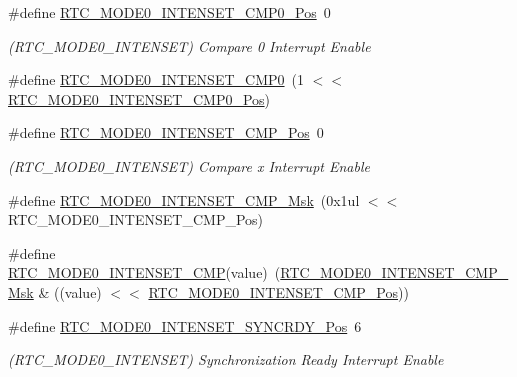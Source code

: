 \begin{DoxyCompactItemize}
\#define \mbox{\hyperlink{group___s_a_m_d21___r_t_c_ga00b70aff1636314843a9f4d3e8d1c27f}{R\+T\+C\+\_\+\+M\+O\+D\+E0\+\_\+\+I\+N\+T\+E\+N\+S\+E\+T\+\_\+\+C\+M\+P0\+\_\+\+Pos}}~0
\begin{DoxyCompactList}\small\item\em (R\+T\+C\+\_\+\+M\+O\+D\+E0\+\_\+\+I\+N\+T\+E\+N\+S\+ET) Compare 0 Interrupt Enable \end{DoxyCompactList}\item 
\#define \mbox{\hyperlink{group___s_a_m_d21___r_t_c_ga0067531668edb6910c70cd57eea04765}{R\+T\+C\+\_\+\+M\+O\+D\+E0\+\_\+\+I\+N\+T\+E\+N\+S\+E\+T\+\_\+\+C\+M\+P0}}~(1 $<$$<$ \mbox{\hyperlink{group___s_a_m_d21___r_t_c_ga00b70aff1636314843a9f4d3e8d1c27f}{R\+T\+C\+\_\+\+M\+O\+D\+E0\+\_\+\+I\+N\+T\+E\+N\+S\+E\+T\+\_\+\+C\+M\+P0\+\_\+\+Pos}})
\item 
\#define \mbox{\hyperlink{group___s_a_m_d21___r_t_c_gaac99a4ba6781229ea22960ac65244ace}{R\+T\+C\+\_\+\+M\+O\+D\+E0\+\_\+\+I\+N\+T\+E\+N\+S\+E\+T\+\_\+\+C\+M\+P\+\_\+\+Pos}}~0
\begin{DoxyCompactList}\small\item\em (R\+T\+C\+\_\+\+M\+O\+D\+E0\+\_\+\+I\+N\+T\+E\+N\+S\+ET) Compare x Interrupt Enable \end{DoxyCompactList}\item 
\#define \mbox{\hyperlink{group___s_a_m_d21___r_t_c_gadb7a972905c2e549aaff1355358b66ae}{R\+T\+C\+\_\+\+M\+O\+D\+E0\+\_\+\+I\+N\+T\+E\+N\+S\+E\+T\+\_\+\+C\+M\+P\+\_\+\+Msk}}~(0x1ul $<$$<$ R\+T\+C\+\_\+\+M\+O\+D\+E0\+\_\+\+I\+N\+T\+E\+N\+S\+E\+T\+\_\+\+C\+M\+P\+\_\+\+Pos)
\item 
\#define \mbox{\hyperlink{group___s_a_m_d21___r_t_c_gabf27c28f941fc2a7a091ed7ee0418fda}{R\+T\+C\+\_\+\+M\+O\+D\+E0\+\_\+\+I\+N\+T\+E\+N\+S\+E\+T\+\_\+\+C\+MP}}(value)~(\mbox{\hyperlink{group___s_a_m_d21___r_t_c_gadb7a972905c2e549aaff1355358b66ae}{R\+T\+C\+\_\+\+M\+O\+D\+E0\+\_\+\+I\+N\+T\+E\+N\+S\+E\+T\+\_\+\+C\+M\+P\+\_\+\+Msk}} \& ((value) $<$$<$ \mbox{\hyperlink{group___s_a_m_d21___r_t_c_gaac99a4ba6781229ea22960ac65244ace}{R\+T\+C\+\_\+\+M\+O\+D\+E0\+\_\+\+I\+N\+T\+E\+N\+S\+E\+T\+\_\+\+C\+M\+P\+\_\+\+Pos}}))
\item 
\#define \mbox{\hyperlink{group___s_a_m_d21___r_t_c_ga99dea220423b4e598708216acc58591c}{R\+T\+C\+\_\+\+M\+O\+D\+E0\+\_\+\+I\+N\+T\+E\+N\+S\+E\+T\+\_\+\+S\+Y\+N\+C\+R\+D\+Y\+\_\+\+Pos}}~6
\begin{DoxyCompactList}\small\item\em (R\+T\+C\+\_\+\+M\+O\+D\+E0\+\_\+\+I\+N\+T\+E\+N\+S\+ET) Synchronization Ready Interrupt Enable \end{DoxyCompactList}\item 
$$
\end{DoxyCompactItemize}
